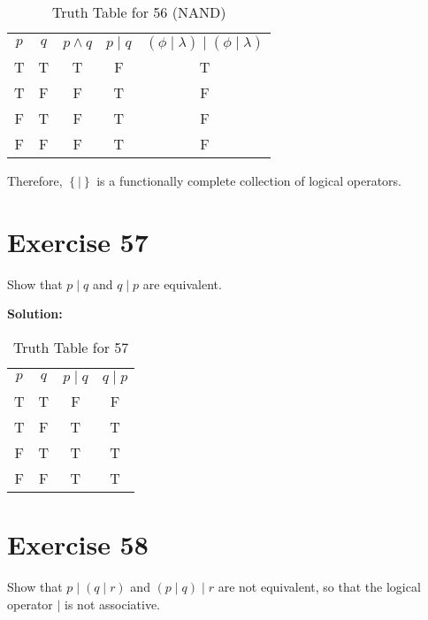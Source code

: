 \documentclass{Axon}
\begin{document}
\begin{table}[ht]
\centering
\begin{tabular}{c|c|c|c|c}
    \(p\) & \(q\) & \(p \land q\) & \(p \mathbin{\mid} q\) & \(\left(\phi \mathbin{\mid} \lambda\right) \mathbin{\mid} \left(\phi \mathbin{\mid} \lambda\right)\) \\
    T     & T     & T             & F                      & T                                                                                                    \\
    T     & F     & F             & T                      & F                                                                                                    \\
    F     & T     & F             & T                      & F                                                                                                    \\
    F     & F     & F             & T                      & F
\end{tabular}
\caption{Truth Table for 56 (NAND)}
\label{Truth Table for 56 (NAND)}
\end{table}

Therefore, \(\left\{\mathbin{\mid}\right\}\) is a functionally complete collection of logical operators.

\section*{Exercise 57}
Show that \(p \mathbin{\mid} q\) and \(q \mathbin{\mid} p\) are equivalent.

\noindent
\textbf{Solution:}
\begin{table}[ht]
\centering
\begin{tabular}{c|c|c|c}
    \(p\) & \(q\) & \(p \mathbin{\mid} q\) & \(q \mathbin{\mid} p\) \\
    T     & T     & F                      & F                      \\
    T     & F     & T                      & T                      \\
    F     & T     & T                      & T                      \\
    F     & F     & T                      & T
\end{tabular}
\caption{Truth Table for 57}
\end{table}

\section*{Exercise 58}
Show that \(p \mathbin{\mid} \left(q \mathbin{\mid} r\right)\) and \(\left(p \mathbin{\mid} q\right) \mathbin{\mid} r\) are not equivalent, so that the logical operator \(\mathbin{\mid}\) is not associative.
\end{document}
